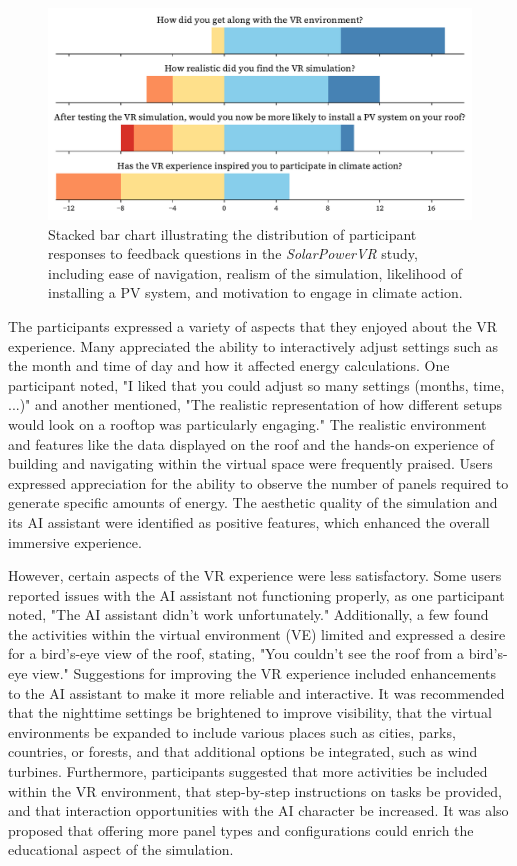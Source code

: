 \documentclass[draft, final]{vutinfth} %
\begin{document}
\begin{figure}[h]
    \centering
    \includegraphics[width=\textwidth]{graphics/feedback-solarpowervr.pdf}
    \caption{Stacked bar chart illustrating the distribution of participant responses to feedback questions in the \textit{SolarPowerVR} study, including ease of navigation, realism of the simulation, likelihood of installing a PV system, and motivation to engage in climate action.}
    \label{fig:feedback-solarpowervr}
\end{figure}

The participants expressed a variety of aspects that they enjoyed about the VR experience. Many appreciated the ability to interactively adjust settings such as the month and time of day and how it affected energy calculations. One participant noted, "I liked that you could adjust so many settings (months, time, ...)" and another mentioned, "The realistic representation of how different setups would look on a rooftop was particularly engaging." The realistic environment and features like the data displayed on the roof and the hands-on experience of building and navigating within the virtual space were frequently praised. Users expressed appreciation for the ability to observe the number of panels required to generate specific amounts of energy. The aesthetic quality of the simulation and its AI assistant were identified as positive features, which enhanced the overall immersive experience.

However, certain aspects of the VR experience were less satisfactory. Some users reported issues with the AI assistant not functioning properly, as one participant noted, "The AI assistant didn't work unfortunately." Additionally, a few found the activities within the virtual environment (VE) limited and expressed a desire for a bird's-eye view of the roof, stating, "You couldn't see the roof from a bird's-eye view." Suggestions for improving the VR experience included enhancements to the AI assistant to make it more reliable and interactive. It was recommended that the nighttime settings be brightened to improve visibility, that the virtual environments be expanded to include various places such as cities, parks, countries, or forests, and that additional options be integrated, such as wind turbines. Furthermore, participants suggested that more activities be included within the VR environment, that step-by-step instructions on tasks be provided, and that interaction opportunities with the AI character be increased. It was also proposed that offering more panel types and configurations could enrich the educational aspect of the simulation.
\end{document}
